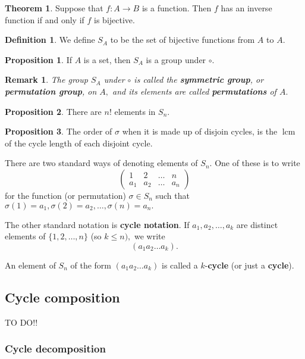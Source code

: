 \documentclass[12pt, a4paper]{article}
\DeclareMathOperator{\lcm}{lcm}
\newtheorem*{remark}{Remark}
\theoremstyle{definition}
\newtheorem{definition}{Definition}[section]
\newtheorem{theorem}{Theorem}[section]
\newtheorem{proposition}{Proposition}
\theoremstyle{plain}
\begin{document}
\begin{theorem}
Suppose that $f : A \to B$ is a function. Then $f$ has an inverse function if and only if $f$ is bijective.
\end{theorem}

\begin{definition}
We define $S_A$ to be the set of bijective functions from $A$ to $A.$
\end{definition}

\begin{proposition}
If $A$ is a set, then $S_A$ is a group under $\circ.$
\end{proposition}

\begin{remark}
The group $S_A$ under $\circ$ is called the \textbf{symmetric group}, or \textbf{permutation group}, on $A,$ and its elements are called \textbf{permutations} of $A.$
\end{remark}

\begin{proposition}
There are $n!$ elements in $S_n.$
\end{proposition}

\begin{proposition}
The order of $\sigma$ when it is made up of disjoin cycles, is the $\lcm$ of the cycle length of each disjoint cycle.
\end{proposition}

There are two standard ways of denoting elements of $S_n.$ One of these is to write 
$$\begin{pmatrix} 1&2&\ldots&n \\ a_1 & a_2 &\ldots & a_n  \end{pmatrix}$$ for the function (or permutation) $\sigma \in S_n$ such that $\sigma(1) = a_1, \sigma(2) = a_2,\ldots, \sigma(n) = a_n.$

The other standard notation is \textbf{cycle notation}. If $a_1, a_2,\ldots, a_k$ are distinct elements of $\{1,2,\ldots,n\}$ (so $k \leq n),$ we write 
$$(a_1a_2\ldots a_k).$$

An element of $S_n$ of the form $(a_1a_2\ldots a_k)$ is called a $k$-\textbf{cycle} (or just a \textbf{cycle}).

\subsection{Cycle composition}

TO DO!!

\subsubsection{Cycle decomposition}
\end{document}
